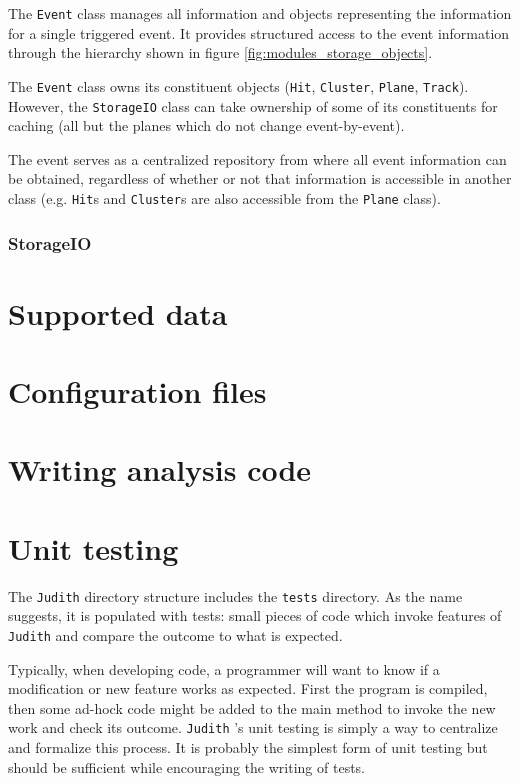 \documentclass[10pt,a4paper]{book}
\newcommand{\Judith}{\Verb`Judith` }
\begin{document}
The \Verb`Event` class manages all information and objects representing the information for a single triggered event. It provides structured access to the event information through the hierarchy shown in figure \ref{fig:modules_storage_objects}.
 
The \Verb`Event` class owns its constituent objects (\Verb`Hit`, \Verb`Cluster`, \Verb`Plane`, \Verb`Track`). However, the \Verb`StorageIO` class can take ownership of some of its constituents for caching (all but the planes which do not change event-by-event).

The event serves as a centralized repository from where all event information can be obtained, regardless of whether or not that information is accessible in another class (e.g. \Verb`Hit`s and \Verb`Cluster`s are also accessible from the \Verb`Plane` class).

\subsection{StorageIO}

\chapter{Supported data}

\chapter{Configuration files}

\chapter{Writing analysis code}

\chapter{Unit testing}
\label{ch:unittesting}

The \Judith directory structure includes the \Verb`tests` directory. As the name suggests, it is populated with tests: small pieces of code which invoke features of \Judith and compare the outcome to what is expected.

Typically, when developing code, a programmer will want to know if a modification or new feature works as expected. First the program is compiled, then some ad-hock code might be added to the main method to invoke the new work and check its outcome. \Judith's unit testing is simply a way to centralize and formalize this process. It is probably the simplest form of unit testing but should be sufficient while encouraging the writing of tests.
\end{document}
